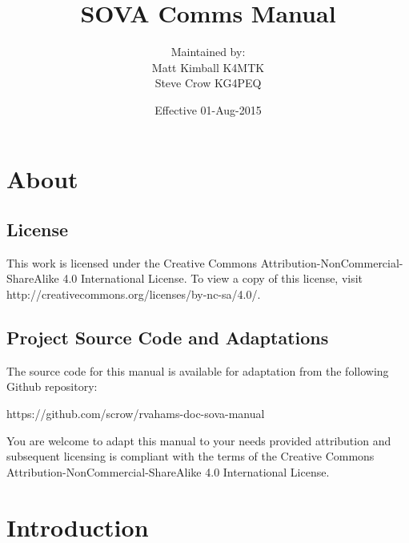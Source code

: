 \documentclass[pdflatex,letterpaper,twoside,12pt]{book}
\title             {SOVA Comms Manual}
\author            {Maintained by:\\Matt Kimball K4MTK\\Steve Crow KG4PEQ}
\date              {Effective 01-Aug-2015}
\begin{document}
\rvahTitlePage
\skipToTOC
\rvahTOC


\chapter{About}

\section{License}

This work is licensed under the Creative Commons Attribution-NonCommercial-ShareAlike 4.0 International License. To view a copy of this license, visit\\
http://creativecommons.org/licenses/by-nc-sa/4.0/.

\section{Project Source Code and Adaptations}

The source code for this manual is available for adaptation from the following Github repository:

https://github.com/scrow/rvahams-doc-sova-manual

You are welcome to adapt this manual to your needs provided attribution and subsequent licensing is compliant with the terms of the Creative Commons Attribution-NonCommercial-ShareAlike 4.0 International License.


\chapter{Introduction}
\end{document}

